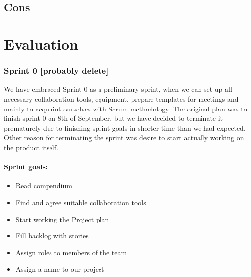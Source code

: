 \subsection{Cons}
\section{Evaluation}



\subsubsection{Sprint 0 [probably delete]}
We have embraced Sprint 0 as a preliminary sprint, when we can set up all necessary collaboration tools, equipment, prepare templates for meetings and mainly to acquaint ourselves with Scrum methodology. The original plan was to finish sprint 0 on 8th of September, but we have decided to terminate it prematurely due to finishing sprint goals in shorter time than we had expected. Other reason for terminating the sprint was desire to start actually working on the product itself.

\paragraph{Sprint goals:}
\begin{itemize}
    \item Read compendium
    \item Find and agree suitable collaboration tools
    \item Start working the Project plan
    \item Fill backlog with stories
    \item Assign roles to members of the team
    \item Assign a name to our project
\end{itemize}